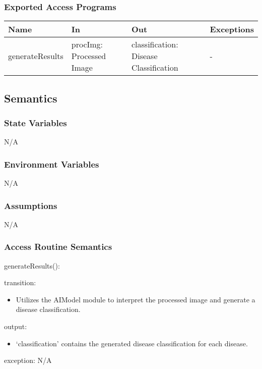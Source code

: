 \documentclass[12pt, titlepage]{article}
\begin{document}
\subsubsection{Exported Access Programs}

\begin{center}
  \begin{tabular}{p{3cm} p{4cm} p{4cm} p{3cm}}
    \hline
    \textbf{Name} & \textbf{In} & \textbf{Out} & \textbf{Exceptions} \\
    \hline
    generateResults & procImg: Processed Image & classification: Disease
      Classification & - \\
    \hline
  \end{tabular}
\end{center}

\subsection{Semantics}

\subsubsection{State Variables}
N/A

\subsubsection{Environment Variables}
N/A

\subsubsection{Assumptions}
N/A

\subsubsection{Access Routine Semantics}

\noindent generateResults():
\begin{itemize}
  \begin{item}
    transition:
    \begin{itemize}
      \item Utilizes the AIModel module to interpret the processed image and
        generate a disease classification. 
    \end{itemize}
  \end{item}
  \begin{item}
    output:
    \begin{itemize}
      \item `classification' contains the generated disease classification for
        each disease.
    \end{itemize}
  \end{item}
  \begin{item}
    exception: N/A 
  \end{item}
\end{itemize}
\end{document}
